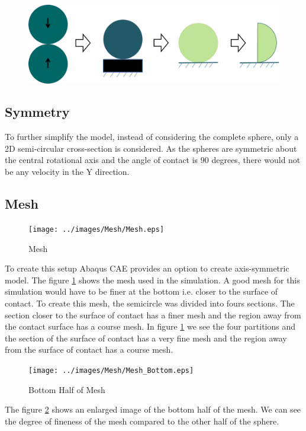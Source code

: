\begin{figure}[H]
	\centering
	\includegraphics[scale=0.5]{../images/SimulationSetup/sphere2D.png}
\end{figure}
\subsection{Symmetry}
To further simplify the model, instead of considering the complete sphere, only a 2D semi-circular cross-section is considered. As the spheres are symmetric about the central rotational axis and the angle of contact is 90 degrees, there would not be any velocity in the Y direction. 

\subsection{Mesh}

\begin{figure}[H]
    \centering
	\texttt{[image: ../images/Mesh/Mesh.eps]}
	\caption{Mesh}
	\label{fig:mesh}
\end{figure}

To create this setup Abaqus CAE provides an option to create axis-symmetric model. The figure \ref{fig:mesh} shows the mesh used in the simulation. A good mesh for this simulation would have to be finer at the bottom i.e. closer to the surface of contact. To create this mesh, the semicircle was divided into fours sections. The section closer to the surface of contact has a finer mesh and the region away from the contact surface has a course mesh. In figure \ref{fig:mesh} we see the four partitions and the section of the surface of contact has a very fine mesh and the region away from the surface of contact has a course mesh.


\begin{figure}[H]
    \centering
	\texttt{[image: ../images/Mesh/Mesh\_Bottom.eps]}
	\caption{Bottom Half of Mesh}
	\label{fig:mesh_bottom_half}
\end{figure}

The figure \ref{fig:mesh_bottom_half} shows an enlarged image of the bottom half of the mesh. We can see the degree of fineness of the mesh compared to the other half of the sphere.


